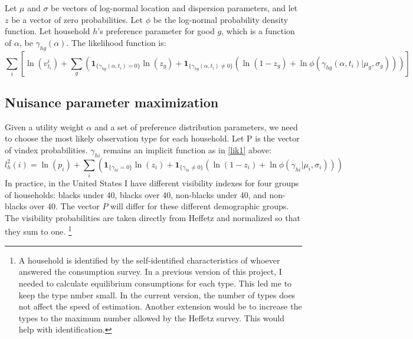 \documentclass[12pt]{article}
\begin{document}
Let $\mu$ and $\sigma$ be vectors of log-normal location and dispersion parameters, and let $z$ be a vector of zero probabilities. Let $\phi$ be the log-normal probability density function. Let household $h$'s preference parameter for good $g$, which is a function of $\alpha$, be $\gamma_{hg}(\alpha)$.  The likelihood function is:
\begin{equation}
	\label{lik1}
    \sum_{i}\left[ \ln(v^i_{t_i}) + \sum_{g} \left(\mathbf{1}_{\{\gamma_{hg}(\alpha, t_i) = 0\}}\ln\left(z_g\right) + \mathbf{1}_{\{\gamma_{hg}(\alpha, t_i) \neq 0\}} \left(\ln\left(1 - z_g\right)+\ln \phi(\gamma_{hg}(\alpha, t_i)|\mu_g,\sigma_g)\right)\right)\right]
\end{equation}

\subsection{Nuisance parameter maximization}

Given a utility weight $\alpha$ and a set of preference distribution parameters, we need to choose the most likely observation type for each household. Let P is the vector of vindex probabilities.  $\gamma_{hi}$ remains an implicit function as in \eqref{lik1} above:
\begin{equation}
    \label{lik2}
    l_h^2(i) = \ln(p_i) + \sum_{i} \left(\mathbf{1}_{\{\gamma_{hi} = 0\}}\ln\left(z_i\right) + \mathbf{1}_{\{\gamma_{hi} \neq 0\}} \left(\ln\left(1-z_i\right)+\ln \phi(\gamma_{hi}|\mu_i,\sigma_i)\right)\right)
\end{equation}
In practice, in the United States I have different visibility indexes for four groups of households: blacks under 40, blacks over 40, non-blacks under 40, and non-blacks over 40.
The vector $P$ will differ for these different demographic groups.
The visibility probabilities are taken directly from Heffetz and normalized so that they sum to one.
\footnote{A household is identified by the self-identified characteristics of whoever answered the consumption survey. 
In a previous version of this project, I needed to calculate equilibrium consumptions for each type.  This led me to keep the type nmber small.  In the current version, the number of types does not affect the speed of estimation.  Another extension would be to increase the types to the maximum number allowed by the Heffetz survey. This would help with identification.}
\end{document}

